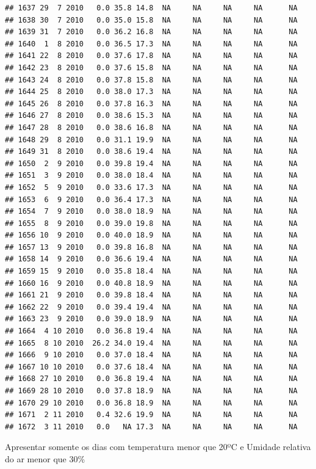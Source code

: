 \documentclass[
]{book}
\begin{document}
\begin{verbatim}
## 1637 29  7 2010   0.0 35.8 14.8  NA     NA     NA     NA      NA
## 1638 30  7 2010   0.0 35.0 15.8  NA     NA     NA     NA      NA
## 1639 31  7 2010   0.0 36.2 16.8  NA     NA     NA     NA      NA
## 1640  1  8 2010   0.0 36.5 17.3  NA     NA     NA     NA      NA
## 1641 22  8 2010   0.0 37.6 17.8  NA     NA     NA     NA      NA
## 1642 23  8 2010   0.0 37.6 15.8  NA     NA     NA     NA      NA
## 1643 24  8 2010   0.0 37.8 15.8  NA     NA     NA     NA      NA
## 1644 25  8 2010   0.0 38.0 17.3  NA     NA     NA     NA      NA
## 1645 26  8 2010   0.0 37.8 16.3  NA     NA     NA     NA      NA
## 1646 27  8 2010   0.0 38.6 15.3  NA     NA     NA     NA      NA
## 1647 28  8 2010   0.0 38.6 16.8  NA     NA     NA     NA      NA
## 1648 29  8 2010   0.0 31.1 19.9  NA     NA     NA     NA      NA
## 1649 31  8 2010   0.0 38.6 19.4  NA     NA     NA     NA      NA
## 1650  2  9 2010   0.0 39.8 19.4  NA     NA     NA     NA      NA
## 1651  3  9 2010   0.0 38.0 18.4  NA     NA     NA     NA      NA
## 1652  5  9 2010   0.0 33.6 17.3  NA     NA     NA     NA      NA
## 1653  6  9 2010   0.0 36.4 17.3  NA     NA     NA     NA      NA
## 1654  7  9 2010   0.0 38.0 18.9  NA     NA     NA     NA      NA
## 1655  8  9 2010   0.0 39.0 19.8  NA     NA     NA     NA      NA
## 1656 10  9 2010   0.0 40.0 18.9  NA     NA     NA     NA      NA
## 1657 13  9 2010   0.0 39.8 16.8  NA     NA     NA     NA      NA
## 1658 14  9 2010   0.0 36.6 19.4  NA     NA     NA     NA      NA
## 1659 15  9 2010   0.0 35.8 18.4  NA     NA     NA     NA      NA
## 1660 16  9 2010   0.0 40.8 18.9  NA     NA     NA     NA      NA
## 1661 21  9 2010   0.0 39.8 18.4  NA     NA     NA     NA      NA
## 1662 22  9 2010   0.0 39.4 19.4  NA     NA     NA     NA      NA
## 1663 23  9 2010   0.0 39.0 18.9  NA     NA     NA     NA      NA
## 1664  4 10 2010   0.0 36.8 19.4  NA     NA     NA     NA      NA
## 1665  8 10 2010  26.2 34.0 19.4  NA     NA     NA     NA      NA
## 1666  9 10 2010   0.0 37.0 18.4  NA     NA     NA     NA      NA
## 1667 10 10 2010   0.0 37.6 18.4  NA     NA     NA     NA      NA
## 1668 27 10 2010   0.0 36.8 19.4  NA     NA     NA     NA      NA
## 1669 28 10 2010   0.0 37.8 18.9  NA     NA     NA     NA      NA
## 1670 29 10 2010   0.0 36.8 18.9  NA     NA     NA     NA      NA
## 1671  2 11 2010   0.4 32.6 19.9  NA     NA     NA     NA      NA
## 1672  3 11 2010   0.0   NA 17.3  NA     NA     NA     NA      NA
\end{verbatim}

Apresentar somente os dias com temperatura menor que 20ºC e Umidade relativa do ar menor que 30\%
\end{document}
